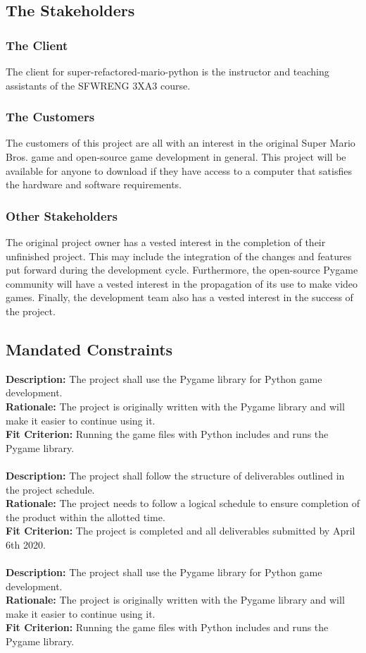 \documentclass[12pt, titlepage]{article}
\begin{document}
\subsection{The Stakeholders}

\subsubsection{The Client}
    The client for super-refactored-mario-python is the instructor and teaching assistants of the SFWRENG 3XA3 course.
\subsubsection{The Customers}
    The customers of this project are all with an interest in the original Super Mario Bros. game and open-source game development in general. This project will be available for anyone to download if they have access to a computer that satisfies the hardware and software requirements.
\subsubsection{Other Stakeholders}
    The original project owner has a vested interest in the completion of their unfinished project. This may include the integration of the changes and features put forward during the development cycle. Furthermore, the open-source Pygame community will have a vested interest in the propagation of its use to make video games. Finally, the development team also has a vested interest in the success of the project.
\subsection{Mandated Constraints}
    \textbf{Description:} The project shall use the Pygame library for Python game development.\\
    \textbf{Rationale:} The project is originally written with the Pygame library and will make it easier to continue using it.\\
    \textbf{Fit Criterion:} Running the game files with Python includes and runs the Pygame library.\\\\
    \textbf{Description:} The project shall follow the structure of deliverables outlined in the project schedule.\\
    \textbf{Rationale:} The project needs to follow a logical schedule to ensure completion of the product within the allotted time.\\
    \textbf{Fit Criterion:} The project is completed and all deliverables submitted by April 6th 2020.\\\\
    \textbf{Description:} The project shall use the Pygame library for Python game development.\\
    \textbf{Rationale:} The project is originally written with the Pygame library and will make it easier to continue using it.\\
    \textbf{Fit Criterion:} Running the game files with Python includes and runs the Pygame library.\\\\
\end{document}
